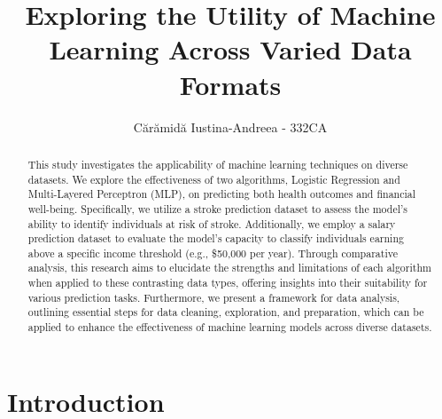 \documentclass[runningheads]{paper}
\begin{document}
%
\title{Exploring the Utility of Machine Learning Across Varied Data Formats}
%
\author{Cărămidă Iustina-Andreea - 332CA}
%
%
\maketitle              %
%
\begin{abstract}
    This study investigates the applicability of machine learning techniques on 
    diverse datasets. We explore the effectiveness of two algorithms, Logistic 
    Regression and Multi-Layered Perceptron (MLP), on predicting both health 
    outcomes and financial well-being. Specifically, we utilize a stroke 
    prediction dataset to assess the model's ability to identify individuals at 
    risk of stroke. Additionally, we employ a salary prediction dataset to 
    evaluate the model's capacity to classify individuals earning above a 
    specific income threshold (e.g., \$50,000 per year). Through comparative 
    analysis, this research aims to elucidate the strengths and limitations of 
    each algorithm when applied to these contrasting data types, offering 
    insights into their suitability for various prediction tasks. Furthermore, 
    we present a framework for data analysis, outlining essential steps for data
    cleaning, exploration, and preparation, which can be applied to enhance the 
    effectiveness of machine learning models across diverse datasets.


\end{abstract}
\section{Introduction}
\end{document}
